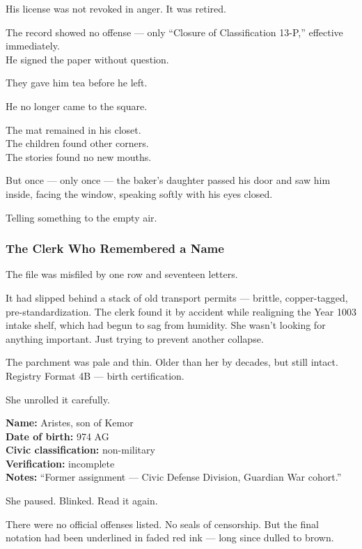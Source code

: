 \documentclass[12pt]{article}
\begin{document}
His license was not revoked in anger. It was retired.

The record showed no offense --- only ``Closure of Classification 13-P,'' effective immediately.\\
He signed the paper without question.

They gave him tea before he left.

\vspace{1em}

He no longer came to the square.

The mat remained in his closet.\\
The children found other corners.\\
The stories found no new mouths.

But once --- only once --- the baker’s daughter passed his door and saw him inside, facing the window, speaking softly with his eyes closed.

Telling something to the empty air.

\dotfill

\subsubsection{The Clerk Who Remembered a Name}

The file was misfiled by one row and seventeen letters.

It had slipped behind a stack of old transport permits --- brittle, copper-tagged, pre-standardization. The clerk found it by accident while realigning the Year 1003 intake shelf, which had begun to sag from humidity. She wasn’t looking for anything important. Just trying to prevent another collapse.

The parchment was pale and thin. Older than her by decades, but still intact. Registry Format 4B --- birth certification.

She unrolled it carefully.

\textbf{Name:} Aristes, son of Kemor\\
\textbf{Date of birth:} 974 AG\\
\textbf{Civic classification:} non-military\\
\textbf{Verification:} incomplete\\
\textbf{Notes:} “Former assignment --- Civic Defense Division, Guardian War cohort.”

She paused. Blinked. Read it again.

There were no official offenses listed. No seals of censorship. But the final notation had been underlined in faded red ink --- long since dulled to brown.
\end{document}

